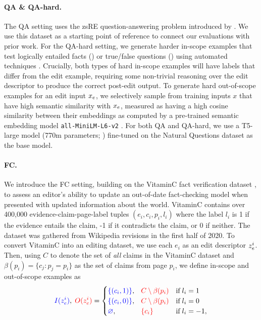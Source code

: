 \documentclass{article}
\begin{document}
\paragraph{QA \& QA-hard.} The QA setting uses the zsRE question-answering problem introduced by \citet{Cao2021EditingFK}. We use this dataset as a starting point of reference to connect our evaluations with prior work. For the QA-hard setting, we generate harder in-scope examples that test logically entailed facts () or true/false questions () using automated techniques \citep{demszky2018transforming,ribeiro2019red}. Crucially, both types of hard in-scope examples will have labels that differ from the edit example, requiring some non-trivial reasoning over the edit descriptor to produce the correct post-edit output. To generate hard out-of-scope examples for an edit input $\xe$, we selectively sample from training inputs $x$ that have high semantic similarity with $\xe$, measured as having a high cosine similarity between their embeddings as computed by a pre-trained semantic embedding model \texttt{all-MiniLM-L6-v2} \citep{reimers-2019-sentence-bert}. For both QA and QA-hard, we use a T5-large model (770m parameters; \citet{2020t5}) fine-tuned on the Natural Questions dataset \citep{kwiatkowski2019natural,roberts2020knowledge} as the base model.

\paragraph{FC.} We introduce the FC setting, building on the VitaminC fact verification dataset \citep{schuster-etal-2021-get}, to assess an editor's ability to update an out-of-date fact-checking model when presented with updated information about the world. VitaminC contains over 400,000 evidence-claim-page-label tuples $(e_i, c_i, p_i, l_i)$ where the label $l_i$ is 1 if the evidence entails the claim, -1 if it contradicts the claim, or 0 if neither. The dataset was gathered from Wikipedia revisions in the first half of 2020. To convert VitaminC into an editing dataset, we use each $e_i$ as an edit descriptor $\ze[i]$. Then, using $C$ to denote the set of \textit{all} claims in the VitaminC dataset and $\beta(p_i)=\{c_j : p_j = p_i\}$ as the set of claims from page $p_i$, we define in-scope and out-of-scope examples as
\begin{equation*}
    \textcolor{blue}{I(\ze[i])},\;\textcolor{red}{O(\ze[i])} = \begin{cases}
        \textcolor{blue}{\{(c_i, 1)\}},\phantom{\varnothing} \textcolor{red}{C \setminus \beta(p_i)} & \text{if}\;l_i = 1 \\
        \textcolor{blue}{\{(c_i, 0)\}},\phantom{\varnothing} \textcolor{red}{C \setminus \beta(p_i)} & \text{if}\;l_i = 0 \\
        \textcolor{blue}{\varnothing},\phantom{\{(c_i, 0)\}} \textcolor{red}{\{c_i\}} & \text{if}\;l_i = -1,
    \end{cases}
\end{equation*}
\end{document}
